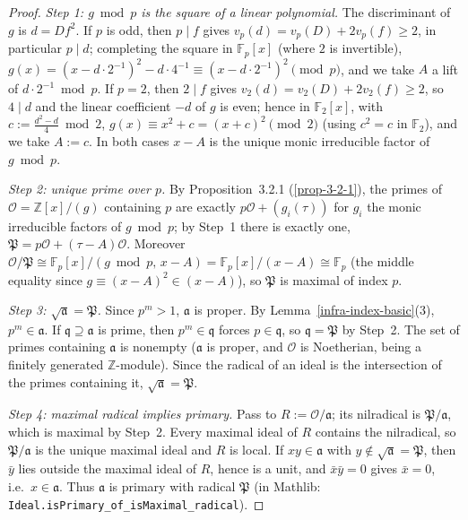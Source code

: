 \begin{proof}
  \emph{Step 1: $g \bmod p$ is the square of a linear polynomial.} The discriminant of $g$
  is $d = Df^2$. If $p$ is odd, then $p \mid f$ gives
  $v_p(d) = v_p(D) + 2 v_p(f) \ge 2$, in particular $p \mid d$; completing the square in
  $\mathbb{F}_p[x]$ (where $2$ is invertible),
  $g(x) = (x - d \cdot 2^{-1})^2 - d \cdot 4^{-1} \equiv (x - d \cdot 2^{-1})^2 \pmod p$,
  and we take $A$ a lift of $d \cdot 2^{-1} \bmod p$. If $p = 2$, then $2 \mid f$ gives
  $v_2(d) = v_2(D) + 2 v_2(f) \ge 2$, so $4 \mid d$ and the linear coefficient $-d$ of $g$
  is even; hence in $\mathbb{F}_2[x]$, with $c := \tfrac{d^2 - d}{4} \bmod 2$,
  $g(x) \equiv x^2 + c = (x + c)^2 \pmod 2$ (using $c^2 = c$ in $\mathbb{F}_2$), and we take
  $A := c$. In both cases $x - A$ is the unique monic irreducible factor of $g \bmod p$.

  \emph{Step 2: unique prime over $p$.} By Proposition~3.2.1 (\ref{prop-3-2-1}), the primes
  of $\mathcal{O} = \mathbb{Z}[x]/(g)$ containing $p$ are exactly
  $p\mathcal{O} + (g_i(\tau))$ for $g_i$ the monic irreducible factors of $g \bmod p$; by
  Step~1 there is exactly one, $\mathfrak{P} = p\mathcal{O} + (\tau - A)\mathcal{O}$.
  Moreover
  $\mathcal{O}/\mathfrak{P} \cong \mathbb{F}_p[x]/(g \bmod p,\, x - A)
  = \mathbb{F}_p[x]/(x - A) \cong \mathbb{F}_p$
  (the middle equality since $g \equiv (x - A)^2 \in (x - A)$), so $\mathfrak{P}$ is maximal
  of index $p$.

  \emph{Step 3: $\sqrt{\mathfrak{a}} = \mathfrak{P}$.} Since $p^m > 1$, $\mathfrak{a}$ is
  proper. By Lemma~\ref{infra-index-basic}(3), $p^m \in \mathfrak{a}$. If
  $\mathfrak{q} \supseteq \mathfrak{a}$ is prime, then $p^m \in \mathfrak{q}$ forces
  $p \in \mathfrak{q}$, so $\mathfrak{q} = \mathfrak{P}$ by Step~2. The set of primes
  containing $\mathfrak{a}$ is nonempty ($\mathfrak{a}$ is proper, and $\mathcal{O}$ is
  Noetherian, being a finitely generated $\mathbb{Z}$-module). Since the radical of an
  ideal is the intersection of the primes containing it,
  $\sqrt{\mathfrak{a}} = \mathfrak{P}$.

  \emph{Step 4: maximal radical implies primary.} Pass to
  $R := \mathcal{O}/\mathfrak{a}$; its nilradical is $\mathfrak{P}/\mathfrak{a}$, which is
  maximal by Step~2. Every maximal ideal of $R$ contains the nilradical, so
  $\mathfrak{P}/\mathfrak{a}$ is the unique maximal ideal and $R$ is local. If
  $xy \in \mathfrak{a}$ with $y \notin \sqrt{\mathfrak{a}} = \mathfrak{P}$, then $\bar{y}$
  lies outside the maximal ideal of $R$, hence is a unit, and $\bar{x}\bar{y} = 0$ gives
  $\bar{x} = 0$, i.e.\ $x \in \mathfrak{a}$. Thus $\mathfrak{a}$ is primary with radical
  $\mathfrak{P}$ (in Mathlib: \texttt{Ideal.isPrimary\_of\_isMaximal\_radical}).
\end{proof}
